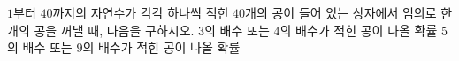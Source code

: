 $1$부터 $40$까지의 자연수가 각각 하나씩 적힌 $40$개의 공이 들어 있는 상자에서 임의로 한 개의 공을 꺼낼 때, 다음을 구하시오.
 $3$의 배수 또는 $4$의 배수가 적힌 공이 나올 확률
 $5$의 배수 또는 $9$의 배수가 적힌 공이 나올 확률
